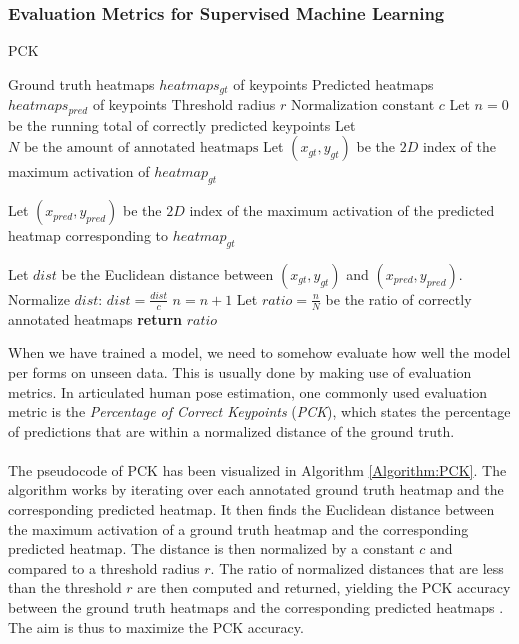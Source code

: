 \documentclass[./main.tex]{subfiles}
\begin{document}
\subsubsection{Evaluation Metrics for Supervised Machine Learning}
\begin{algorithm}[t]
    \caption{PCK \cite{Camilla}\cite{SHG}}
    \label{Algorithm:PCK}
    \begin{algorithmic}[1]
        \Require Ground truth heatmaps $heatmaps_{gt}$ of keypoints
        \Require Predicted heatmaps $heatmaps_{pred}$ of keypoints
        \Require Threshold radius $r$
        \Require Normalization constant $c$
        \State Let $n = 0$ be the running total of correctly predicted keypoints
        \State Let $N \text{ be the amount of annotated heatmaps}$
            \State Let $(x_{gt}, y_{gt})$ be the $2D$ index of the maximum activation of $heatmap_{gt}$
            \State \begin{varwidth}[t]{\linewidth}
                Let $(x_{pred}, y_{pred})$ be the $2D$ index of the maximum activation of the predicted heatmap corresponding to $heatmap_{gt}$
            \end{varwidth}
            \State Let $dist$ be the Euclidean distance between $(x_{gt}, y_{gt})$ and $(x_{pred}, y_{pred})$.
            \State Normalize $dist$: $dist = \frac{dist}{c}$
                \State $n = n + 1$
            \EndIf
        \EndFor
        \State Let $ratio = \frac{n}{N}$ be the ratio of correctly annotated heatmaps
        \State \textbf{return} $ratio$
    \end{algorithmic}
\end{algorithm}
\noindent When we have trained a model, we need to somehow evaluate how well the model per forms on unseen data. This is usually done by making use of evaluation metrics. In articulated human pose estimation, one commonly used evaluation metric is the \textit{Percentage of Correct Keypoints} (\textit{PCK}), which states the percentage of predictions that are within a normalized distance of the ground truth.
\\
\\
The pseudocode of PCK has been visualized in Algorithm \ref{Algorithm:PCK}. The algorithm works by iterating over each annotated ground truth heatmap and the corresponding predicted heatmap. It then finds the Euclidean distance between the maximum activation of a ground truth heatmap and the corresponding predicted heatmap. The distance is then normalized by a constant $c$ and compared to a threshold radius $r$. The ratio of normalized distances that are less than the threshold $r$ are then computed and returned, yielding the PCK accuracy between the ground truth heatmaps and the corresponding predicted heatmaps \cite{Camilla} \cite{SHG}. The aim is thus to maximize the PCK accuracy.
\end{document}
